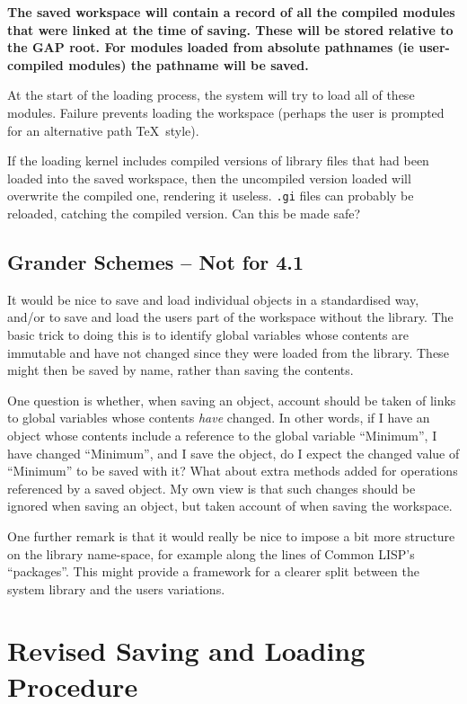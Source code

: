 \documentclass[11pt]{article}
\begin{document}
{\bf The saved workspace will contain a record of all the compiled
modules that were linked at the time of saving. These will be stored
relative to the GAP root. For modules loaded from
absolute pathnames (ie user-compiled modules) the pathname will be
saved.

At the start of the loading process, the system will try to load all
of these modules. Failure prevents loading the workspace (perhaps the
user is prompted for an alternative path \TeX\ style).}


If the loading kernel includes compiled versions of library files that
had been loaded into the saved workspace, then the uncompiled version
loaded will overwrite the compiled one, rendering it useless. \verb|.gi|
files can probably be reloaded, catching the compiled version. Can
this be made safe?

\subsection{Grander Schemes -- Not for 4.1}

It would be nice to save and load individual objects in a standardised
way, and/or to save and load the users part of the workspace without
the library. The basic trick to doing this is to identify global
variables whose contents are immutable and have not changed since they
were loaded from the library. These might then be saved by name,
rather than saving the contents.

One question is whether, when saving an object, account should be
taken of links to global variables whose contents \emph{have}
changed. In other words, if I have an object whose contents include a
reference to the global variable ``Minimum'', I have changed
``Minimum'', and I save the object, do I expect the changed value of
``Minimum'' to be saved with it? What about extra methods added for
operations referenced by a saved object. My own view is that such
changes should be ignored when saving an object, but taken account of
when saving the workspace.

One further remark is that it would really be nice to impose a bit
more structure on the library name-space, for example along the lines
of Common LISP's ``packages''. This might provide a framework for a
clearer split between the system library and the users variations.

\section{Revised Saving and Loading Procedure}
\end{document}

